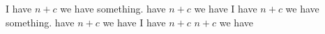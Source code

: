 \documentclass{article}
\begin{document}
I have $ n + c $ we have something. have $ n + c $ we have 
I have $ n + c $ we have something. have $ n + c $ we have 
I have $ n + c $ $ n + c $ we have 
\end{document}
